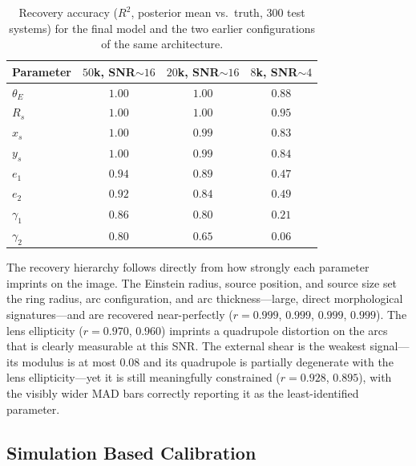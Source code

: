 \documentclass[11pt,a4paper]{article}
\newcommand{\rThetaE}{0.999}\newcommand{\rEone}{0.970}\newcommand{\rEtwo}{0.960}
\newcommand{\rGone}{0.928}\newcommand{\rGtwo}{0.895}
\newcommand{\rXs}{0.999}\newcommand{\rYs}{0.999}\newcommand{\rRs}{0.999}
\newcommand{\RThetaE}{1.00}\newcommand{\REone}{0.94}\newcommand{\REtwo}{0.92}
\newcommand{\RGone}{0.86}\newcommand{\RGtwo}{0.80}
\newcommand{\RXs}{1.00}\newcommand{\RYs}{1.00}\newcommand{\RRs}{1.00}
\begin{document}
\begin{table}[H]
\centering
\caption{Recovery accuracy ($R^2$, posterior mean vs.\ truth, 300 test systems)
for the final model and the two earlier configurations of the same architecture.}
\label{tab:r2}
\begin{tabular}{lccc}
\toprule
Parameter & $50$k, SNR${\sim}16$ & $20$k, SNR${\sim}16$ & $8$k, SNR${\sim}4$ \\
\midrule
$\theta_E$ & $\RThetaE$ & $1.00$ & $0.88$ \\
$R_s$      & $\RRs$     & $1.00$ & $0.95$ \\
$x_s$      & $\RXs$     & $0.99$ & $0.83$ \\
$y_s$      & $\RYs$     & $0.99$ & $0.84$ \\
$e_1$      & $\REone$   & $0.89$ & $0.47$ \\
$e_2$      & $\REtwo$   & $0.84$ & $0.49$ \\
$\gamma_1$ & $\RGone$   & $0.80$ & $0.21$ \\
$\gamma_2$ & $\RGtwo$   & $0.65$ & $0.06$ \\
\bottomrule
\end{tabular}
\end{table}

The recovery hierarchy follows directly from how strongly each parameter imprints
on the image. The Einstein radius, source position, and source size set the ring
radius, arc configuration, and arc thickness---large, direct morphological
signatures---and are recovered near-perfectly
($r = \rThetaE$, $\rXs$, $\rYs$, $\rRs$). The lens ellipticity
($r = \rEone$, $\rEtwo$) imprints a quadrupole distortion on the arcs that is
clearly measurable at this SNR. The external shear is the weakest signal---its
modulus is at most $0.08$ and its quadrupole is partially degenerate with the lens
ellipticity---yet it is still meaningfully constrained
($r = \rGone$, $\rGtwo$), with the visibly wider MAD bars correctly reporting it
as the least-identified parameter.

\subsection{Simulation Based Calibration}
\label{sec:calibration}
\end{document}
